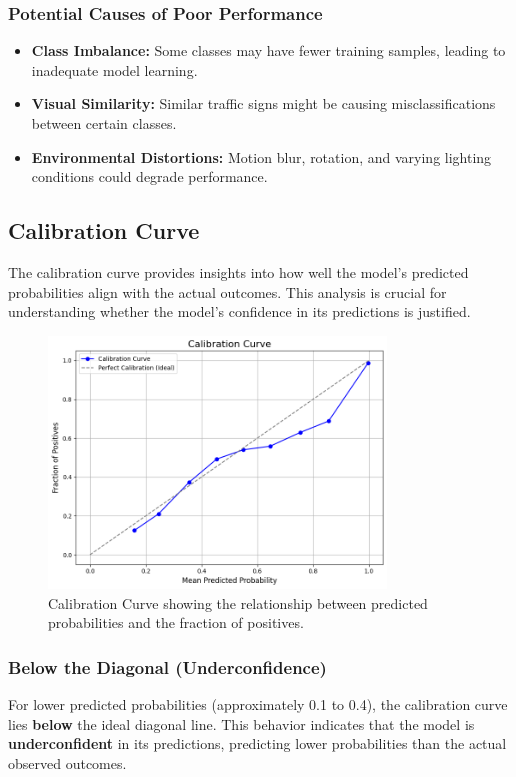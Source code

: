 \subsubsection{Potential Causes of Poor Performance}

\begin{itemize}
    \item \textbf{Class Imbalance:} Some classes may have fewer training samples, leading to inadequate model learning.
    \item \textbf{Visual Similarity:} Similar traffic signs might be causing misclassifications between certain classes.
    \item \textbf{Environmental Distortions:} Motion blur, rotation, and varying lighting conditions could degrade performance.
\end{itemize}

\subsection{Calibration Curve}

The calibration curve provides insights into how well the model's predicted probabilities align with the actual outcomes. This analysis is crucial for understanding whether the model's confidence in its predictions is justified.

\begin{figure}[H]
\centering
\includegraphics[width=0.8\textwidth]{images/figure15.png}
\caption{Calibration Curve showing the relationship between predicted probabilities and the fraction of positives.}
\label{fig:calibration_curve}
\end{figure}

\subsubsection{Below the Diagonal (Underconfidence)}
For lower predicted probabilities (approximately 0.1 to 0.4), the calibration curve lies \textbf{below} the ideal diagonal line. This behavior indicates that the model is \textbf{underconfident} in its predictions, predicting lower probabilities than the actual observed outcomes.

